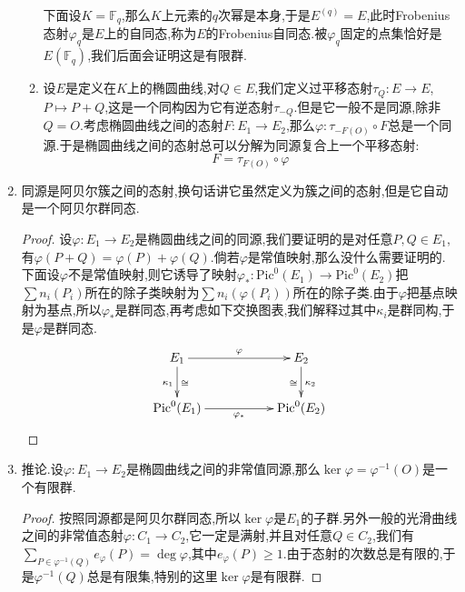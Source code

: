 \begin{enumerate}
\begin{enumerate}
		下面设$K=\mathbb{F}_q$,那么$K$上元素的$q$次幂是本身,于是$E^{(q)}=E$,此时Frobenius态射$\varphi_q$是$E$上的自同态,称为$E$的Frobenius自同态.被$\varphi_q$固定的点集恰好是$E(\mathbb{F}_q)$,我们后面会证明这是有限群.
		\item 设$E$是定义在$K$上的椭圆曲线,对$Q\in E$,我们定义过平移态射$\tau_Q:E\to E$,$P\mapsto P+Q$,这是一个同构因为它有逆态射$\tau_{-Q}$.但是它一般不是同源,除非$Q=O$.考虑椭圆曲线之间的态射$F:E_1\to E_2$,那么$\varphi:\tau_{-F(O)}\circ F$总是一个同源.于是椭圆曲线之间的态射总可以分解为同源复合上一个平移态射:
		$$F=\tau_{F(O)}\circ\varphi$$
	\end{enumerate}
	\item 同源是阿贝尔簇之间的态射,换句话讲它虽然定义为簇之间的态射,但是它自动是一个阿贝尔群同态.
	\begin{proof}
		
		设$\varphi:E_1\to E_2$是椭圆曲线之间的同源,我们要证明的是对任意$P,Q\in E_1$,有$\varphi(P+Q)=\varphi(P)+\varphi(Q)$.倘若$\varphi$是常值映射,那么没什么需要证明的.下面设$\varphi$不是常值映射,则它诱导了映射$\varphi_*:\mathrm{Pic}^0(E_1)\to\mathrm{Pic}^0(E_2)$把$\sum n_i(P_i)$所在的除子类映射为$\sum n_i(\varphi(P_i))$所在的除子类.由于$\varphi$把基点映射为基点,所以$\varphi_*$是群同态,再考虑如下交换图表,我们解释过其中$\kappa_i$是群同构,于是$\varphi$是群同态.
		$$\xymatrix{E_1\ar[rr]^{\varphi}\ar[d]^{\cong}_{\kappa_1}&&E_2\ar[d]^{\kappa_2}_{\cong}\\\mathrm{Pic}^0(E_1)\ar[rr]_{\varphi_*}&&\mathrm{Pic}^0(E_2)}$$
	\end{proof}
	\item 推论.设$\varphi:E_1\to E_2$是椭圆曲线之间的非常值同源,那么$\ker\varphi=\varphi^{-1}(O)$是一个有限群.
	\begin{proof}
		
		按照同源都是阿贝尔群同态,所以$\ker\varphi$是$E_1$的子群.另外一般的光滑曲线之间的非常值态射$\varphi:C_1\to C_2$,它一定是满射,并且对任意$Q\in C_2$,我们有$\sum_{P\in\varphi^{-1}(Q)}e_{\varphi}(P)=\deg\varphi$,其中$e_{\varphi}(P)\ge1$.由于态射的次数总是有限的,于是$\varphi^{-1}(Q)$总是有限集,特别的这里$\ker\varphi$是有限群.
	\end{proof}
\end{enumerate}

